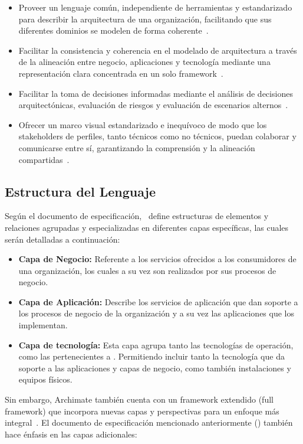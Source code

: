 \begin{itemize}
	\item Proveer un lenguaje común, independiente de herramientas y estandarizado para describir la arquitectura de una organización, facilitando que sus diferentes dominios se modelen de forma coherente~\cite{ArchiMate}.
	\item Facilitar la consistencia y coherencia en el modelado de arquitectura a través de la alineación entre negocio, aplicaciones y tecnología mediante una representación clara concentrada en un solo framework~\cite{OMG01}.
	\item Facilitar la toma de decisiones informadas mediante el análisis de decisiones arquitectónicas, evaluación de riesgos y evaluación de escenarios alternos~\cite{archimetric01}.
	\item Ofrecer un marco visual estandarizado e inequívoco de modo que los stakeholders de perfiles, tanto técnicos como no técnicos, puedan colaborar y comunicarse entre sí, garantizando la comprensión y la alineación compartidas~\cite{archimetric01}.
\end{itemize}


\subsection{Estructura del Lenguaje}

Según el documento de especificación,~\cite{ArchiMate} define estructuras de elementos y relaciones agrupadas y especializadas en diferentes capas específicas, las cuales serán detalladas a continuación:

\begin{itemize}
	\item \textbf{Capa de Negocio:} Referente a los servicios ofrecidos a los consumidores de una organización, los cuales a su vez son realizados por sus procesos de negocio.
	\item \textbf{Capa de Aplicación:} Describe los servicios de aplicación que dan soporte a los procesos de negocio de la organización y a su vez las aplicaciones que los implementan.
	\item \textbf{Capa de tecnología:} Esta capa agrupa tanto las tecnologías de operación, como las pertenecientes a \TI. Permitiendo incluir tanto la tecnología que da soporte a las aplicaciones y capas de negocio, como también instalaciones y equipos físicos.
\end{itemize}

Sin embargo, Archimate también cuenta con un framework extendido (full framework) que incorpora nuevas capas y perspectivas para un enfoque más integral~\cite{leanix01}. El documento de especificación mencionado anteriormente (\cite{ArchiMate}) también hace énfasis en las capas adicionales:

